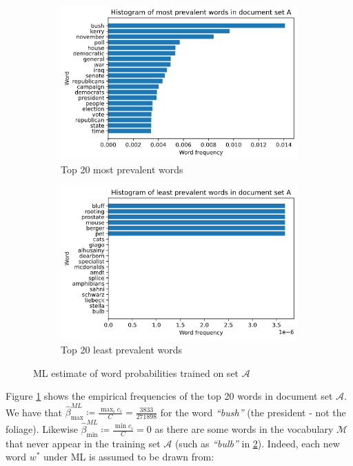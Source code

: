 \documentclass[]{article}
\newcommand{\Acal}{\mathcal{A}}
\newcommand{\Mcal}{\mathcal{M}}
\newcommand{\betaml}{\hat{\beta}^{ML}}
\begin{document}
\begin{figure}[!h]
	\begin{subfigure}{0.5\linewidth}
		\centering
		\includegraphics[width=\linewidth]{hist-ml.png}
		\caption{Top 20 most prevalent words}
		\label{fig:hist-ml-max}
	\end{subfigure}
	\begin{subfigure}{0.5\linewidth}
		\centering
		\includegraphics[width=\linewidth]{hist-ml-min.png}
		\caption{Top 20 least prevalent words}
		\label{fig:hist-ml-min}
	\end{subfigure}
	\caption{ML estimate of word probabilities trained on set $\Acal$}
	\label{fig:hist-ml}
\end{figure}
%
Figure \ref{fig:hist-ml-max} shows the empirical frequencies of the top 20 words in document set $\Acal$. We have that $\betaml_{\max} \coloneqq \frac{\max_i c_i}{C} = \frac{3833}{271898}$ for the word \textit{``bush''} (the president - not the foliage). Likewise $\betaml_{\min} \coloneqq \frac{\min c_i}{C} = 0$ as there are some words in the vocabulary $\Mcal$ that never appear in the training set $\Acal$ (such as \textit{``bulb''} in \ref{fig:hist-ml-min}). Indeed, each new word $w^*$ under ML is assumed to be drawn from:
\end{document}

